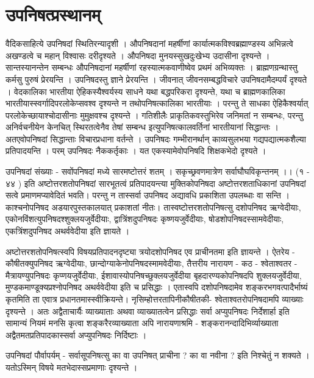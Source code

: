 ﻿\chapter{उपनिषत्प्रस्थानम् }
वैदिकसाहित्ये उपनिषदां स्थितिरन्यादृशी । औपनिषदानां महर्षीणां कार्यात्मकविश्वब्रह्माण्डस्य अभिन्नत्वे अखण्डत्वे च महान् विश्वासः दरीदृश्यते । औपनिषदा मुनयस्सुखदुःखेभ्य उदासीना दृश्यन्ते । सान्तस्यानन्तेन सम्बन्धः औपनिषदानां महर्षीणां रहस्यात्मकवाणीष्वेव प्रथमं अभिव्यक्तः । 
ब्राह्मणग्रन्थास्तु कर्मसु पुरुषं प्रेरयन्ति । उपनिषदस्तु ज्ञाने प्रेरयन्ति । जीवनात् जीवनसम्बद्धविचारे उपनिषदामैदम्पर्यं दृश्यते । वेदकालिका भारतीया ऐहिकस्यैश्वर्यस्य साधने यथा बद्धपरिकरा दृश्यन्ते, यथा च ब्राह्मणकालिका भारतीयास्स्वर्गादिपरलोकेप्सवश्व दृश्यन्ते न तथोपनिषत्कालिका भारतीयाः । परन्तु ते साधका ऐहिकैश्वर्यात् परलोकेच्छायाश्चोदासीनाः मुमुक्षवश्च दृश्यन्ते । गतिशीलैः प्राकृतिकवस्तुभिरेव जनिमतां न सम्बन्धः, परन्तु अनिर्वचनीयेन केनचित् स्थिरतत्वेनैव तेषां सम्बन्ध इत्युपनिषत्कालवर्तिनां भारतीयानां सिद्धान्तः । अतएवोपनिषदां सिद्धान्ताः विचारप्रधाना वर्तन्ते । 
उपनिषदः गम्भीरानर्थान् काव्यसुलभया गद्यपद्यात्मकशैल्या प्रतिपादयन्ति । परम् उपनिषदः नैककर्तृकाः । यत एकस्यामेवोपनिषदि शिक्षकभेदो दृश्यते । 

उपनिषदां संख्याः - 
सवोंपनिषदां मध्ये सारमष्टोत्तरं शतम् ।
सकृच्छ्रवणमात्रेण सर्वाघौघविकृन्तनम् ।। (१ - ४४ ) इति 
अष्टोत्तरशतोपनिषदां सारभूतत्वं प्रतिपादयन्त्या मुक्तिकोपनिषदा अष्टोत्तरशताधिकानां उपनिषदां सत्वे प्रमाणमप्यावेदितं भवति। परन्तु न तास्सर्वा उपनिषद अद्यावधि प्रकाशिता उपलब्धाः वा सन्ति । काश्चनोपनिषद अडयारपुस्तकालयात् प्रकाशतां नीतः। तास्वष्टोत्तरशतोपनिषत्सु दशोपनिषद ऋग्वेदीयाः, एकोनविंशत्युपनिषदश्शुक्लयजुर्वेदीयाः, द्वात्रिंशदुपनिषदः कृष्णयजुर्वेदीयाः, षोडशोपनिषदस्सामवेदीयाः, एकत्रिंशदुपनिषद अथर्ववेदीया इति ज्ञायते । 

अष्टोत्तरशतोपनिषत्स्वपि विषयप्रतिपादनदृष्ट्या त्रयोदशोपनिषद एव प्राचीनतमा इति ज्ञायन्ते । ऐतरेय - कौषीतक्युपनिषद ऋग्वेदीयाः, छान्दोग्याकेनोपनिषदस्मामवेदीयाः, तैत्तरीय नारायण - कठ - श्वेताश्वतर - मैत्रायण्युपनिषदः कृप्णयजुर्वेदीयाः, ईशावास्योपनिषच्छुक्लयजुर्वेदीया बृहदारण्यकोपनिषदपि शुक्लयजुर्वेदीया, मुण्डकमाण्डूक्यप्रश्नोपनिषद अथर्ववेदीया इति च प्रसिद्धाः । एतास्वपि दशोपनिषदामेव शङ्करभगवत्पादैर्भाष्यं कृतमिति ता एवात्र प्रधानतमास्स्वीक्रियन्ते। नृसिम्होत्तरतापिनीकौषीतकी- श्वेताश्वतरोपनिषदामपि व्याख्याः दृश्यन्ते । अतः अद्वैताचार्यैः व्याख्याताः अथवा व्याख्यातत्वेन प्रसिद्धाः सर्वा अप्युपनिषदः निर्देशार्हा इति सामान्यं नियमं मनसि कृत्वा शङ्करैरव्याख्याता अपि नारायणाश्रमि - शङ्करानन्दादिभिर्व्याख्याता अद्वैतमतप्रतिपादकास्सर्वा अप्युपनिषदः निर्दिष्टाः ।

उपनिषदां पौर्वापर्यम् - 
सर्वासूपनिषत्सु का वा उपनिषत् प्राचीना ? का वा नवीना ? इति निश्चेतुं न शक्यते । यतोऽस्मिन् विषये मतभेदास्सप्रमाणाः दृश्यन्ते ।  

